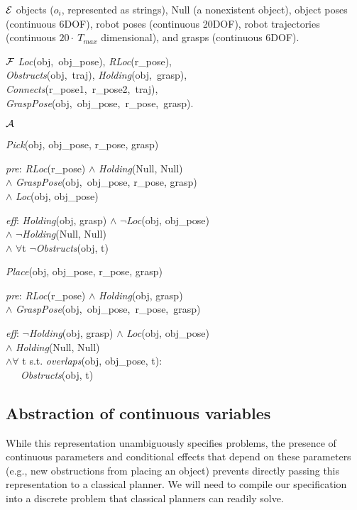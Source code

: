 \begin{tightlist}
\item[$\mathcal{E}$] objects ($o_i$, represented as strings), Null (a
  nonexistent object), object poses (continuous 6DOF), robot poses
  (continuous 20DOF), robot trajectories (continuous $20\cdot~T_{max}$ dimensional),
  and grasps (continuous 6DOF).
\item[$\mathcal{F}$] \emph{Loc}(obj,~obj\_pose), \emph{RLoc}(r\_pose),
  \\\emph{Obstructs}(obj,~traj), \emph{Holding}(obj,~grasp),
  \\\emph{Connects}(r\_pose1,~r\_pose2,~traj),
  \\\emph{GraspPose}(obj,~obj\_pose,~r\_pose,~grasp).
\item[$\mathcal{A}$] \begin{tightlist} \item \emph{Pick}(obj, obj\_pose, r\_pose, grasp)
\begin{tightlist}
   \item[\emph{pre}:] \emph{RLoc}(r\_pose) $\wedge$ \emph{Holding}(Null, Null) \\$\wedge$ \emph{GraspPose}(obj,~obj\_pose, r\_pose, grasp) \\$\wedge$ \emph{Loc}(obj, obj\_pose)
   \item[\emph{eff}:] \emph{Holding}(obj, grasp) $\wedge$ $\lnot$\emph{Loc}(obj, obj\_pose) \\$\wedge$ $\lnot$\emph{Holding}(Null, Null) \\$\wedge$ $\forall$t $\lnot$\emph{Obstructs}(obj, t)
\end{tightlist}
\item \emph{Place}(obj, obj\_pose, r\_pose, grasp)
\begin{tightlist}
   \item[\emph{pre}:] \emph{RLoc}(r\_pose) $\wedge$ \emph{Holding}(obj, grasp) \\ $\wedge$ \emph{GraspPose}(obj,~obj\_pose,~r\_pose,~grasp)
   \item[\emph{eff}:] $\lnot$\emph{Holding}(obj, grasp) $\wedge$ \emph{Loc}(obj, obj\_pose) \\$\wedge$ \emph{Holding}(Null, Null)\\ $\wedge \forall$ t s.t. \emph{overlaps}(obj, obj\_pose, t): \\ \indent \indent \ \ \ \emph{Obstructs}(obj, t)
\end{tightlist}
\end{tightlist}
\end{tightlist}
\subsection{Abstraction of continuous variables}
While this representation unambiguously specifies problems, the
presence of continuous parameters and conditional effects that depend
on these parameters (e.g., new obstructions from placing an object)
prevents directly passing this representation to a classical
planner. We will need to compile our specification into a discrete
problem that classical planners can readily solve.

